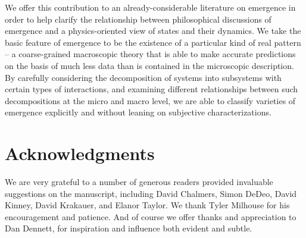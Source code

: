 \documentclass[12pt,english]{article}
\begin{document}
We offer this contribution to an already-considerable literature on emergence in order to help clarify the relationship between philosophical discussions of emergence and a physics-oriented view of states and their dynamics. 
We take the basic feature of emergence to be the existence of a particular kind of real pattern -- a coarse-grained macroscopic theory that is able to make accurate predictions on the basis of much less data than is contained in the microscopic description.
By carefully considering the decomposition of systems into subsystems with certain types of interactions, and examining different relationships between such decompositions at the micro and macro level, we are able to classify varieties of emergence explicitly and without leaning on subjective characterizations.



\section*{Acknowledgments} 

We are very grateful to a number of generous readers provided invaluable suggestions on the manuscript, including David Chalmers, Simon DeDeo, David Kinney, David Krakauer, and Elanor Taylor.
We thank Tyler Milhouse for his encouragement and patience.
And of course we offer thanks and appreciation to Dan Dennett, for inspiration and influence both evident and subtle.




\end{document}
